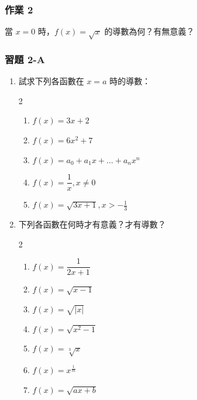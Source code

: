 \subsubsection*{作業 2}
當 $x=0$ 時，$f(x)=\sqrt{x}$ 的導數為何？有無意義？

\subsubsection*{習題 2-A}\label{sec:b6s-ex-app4-2a}

\begin{enumerate}[label=\arabic*., leftmargin=2em]
  \item 試求下列各函數在 $x=a$ 時的導數：
  \begin{multicols}{2}
  \begin{enumerate}[label=(\roman*)]
    \item $f(x)=3x+2$
    \item $f(x)=6x^2+7$
    \item $f(x)=a_0+a_1 x+\dots+a_n x^n$
    \item $f(x)=\dfrac{1}{x}, x\ne 0$
    \item $f(x)=\sqrt{3x+1}, x>-\frac{1}{3}$
  \end{enumerate}
  \end{multicols}

  \item 下列各函數在何時才有意義？才有導數？
  \begin{multicols}{2}
  \begin{enumerate}[label=(\roman*)]
    \item $f(x)=\dfrac{1}{2x+1}$
    \item $f(x)=\sqrt{x-1}$
    \item $f(x)=\sqrt{|x|}$
    \item $f(x)=\sqrt{x^2-1}$
    \item $f(x)=\sqrt[3]{x}$
    \item $f(x)=x^{\frac{1}{m}}$
    \item $f(x)=\sqrt{ax+b}$
  \end{enumerate}
  \end{multicols}


\end{enumerate}
